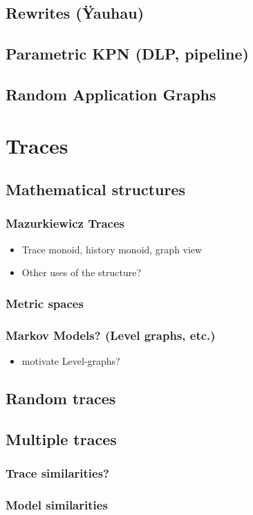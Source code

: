 \documentclass{article}
\begin{document}
\subsection{Rewrites (\"{Y}auhau)}
\subsection{Parametric KPN (DLP, pipeline)}
\subsection{Random Application Graphs}
\section{Traces}
\subsection{Mathematical structures}
\subsubsection{Mazurkiewicz Traces}
\begin{itemize}
\item Trace monoid, history monoid, graph view
\item Other uses of the structure?
\end{itemize}
\subsubsection{Metric spaces}
\subsubsection{Markov Models? (Level graphs, etc.)}
\begin{itemize}
\item{motivate Level-graphs?}
\end{itemize}
\subsection{Random traces}
\subsection{Multiple traces}
\subsubsection{Trace similarities?}
\subsubsection{Model similarities}
\end{document}
